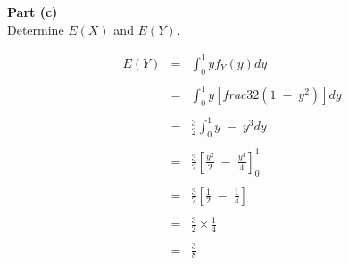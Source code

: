 \documentclass[a4paper,12pt]{article}
\begin{document}
\newpage
\begin{framed}
\large 
\noindent \textbf{Part (c)}\\
\noindent Determine $E(X)$ and $E(Y)$.
\end{framed}

\begin{eqnarray*}
E ( Y ) &=&  \int^{1}_{0} y f_{Y}(y) dy \\ 
& & \\
&=&  \int^{1}_{0} y \left[ frac{3}{2}(1 \;-\; y^2) \right] dy \\
& & \\
&=&   \frac{3}{2} \int^{1}_{0} y \;-\; y^3 dy \\
& & \\
&=&   \frac{3}{2} \left[ \frac{y^2}{2} \;-\; \frac{y^4}{4} \right]^{1}_{0}  \\
& & \\
&=&   \frac{3}{2} \left[ \frac{1}{2} \;-\; \frac{1}{4} \right]  \\
& & \\
&=& \frac{3}{2} \times \frac{1}{4} \\
& & \\
&=& \frac{3}{8}\\
\end{eqnarray*}

\end{document}
